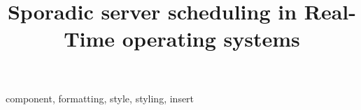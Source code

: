 \documentclass[conference]{IEEEtran}
\begin{document}
\title{Sporadic server scheduling in Real-Time operating systems\\
}

\author{
}

\maketitle

\begin{abstract}

\end{abstract}

\begin{IEEEkeywords}
component, formatting, style, styling, insert
\end{IEEEkeywords}
\end{document}
